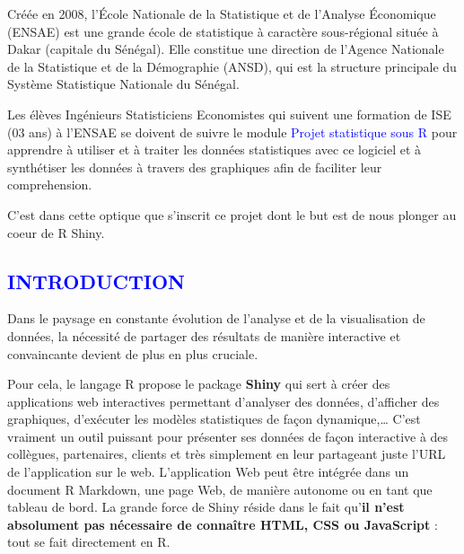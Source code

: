 \documentclass[
]{article}
\author{}
\date{\vspace{-2.5em}}
\begin{document}


\newpage


\renewcommand{\contentsname}{\textcolor{blue}{Sommaire}}

\textcolor{blue}{\tableofcontents}

\newpage

\begin{tcolorbox}[colback=white,colframe=blue, title=Avant-propos ]

Créée en 2008, l’École Nationale de la Statistique et de l’Analyse Économique (ENSAE) est une grande école de statistique à caractère sous-régional située à Dakar (capitale du Sénégal). Elle constitue une direction de l’Agence Nationale de la Statistique et de la Démographie (ANSD), qui est la structure principale du Système Statistique Nationale du Sénégal. 


  Les élèves Ingénieurs Statisticiens Economistes qui suivent une formation de ISE (03 ans) à l'ENSAE  se doivent de suivre le module \textcolor{blue}{Projet statistique sous R } pour apprendre à utiliser et à traiter les données statistiques avec ce logiciel et à synthétiser les données à travers des graphiques afin de faciliter leur comprehension. 
  
  
C’est dans cette optique que s’inscrit ce projet dont le but est de nous plonger au coeur de R Shiny. 
  
\end{tcolorbox}

\newpage

\textcolor{blue}{\section*{INTRODUCTION}}

Dans le paysage en constante évolution de l'analyse et de la
visualisation de données, la nécessité de partager des résultats de
manière interactive et convaincante devient de plus en plus cruciale.

Pour cela, le langage R propose le package \textbf{Shiny} qui sert à
créer des applications web interactives permettant d'analyser des
données, d'afficher des graphiques, d'exécuter les modèles statistiques
de façon dynamique,\ldots{} C'est vraiment un outil puissant pour
présenter ses données de façon interactive à des collègues, partenaires,
clients et très simplement en leur partageant juste l'URL de
l'application sur le web. L'application Web peut être intégrée dans un
document R Markdown, une page Web, de manière autonome ou en tant que
tableau de bord. La grande force de Shiny réside dans le fait
qu'\textbf{il n'est absolument pas nécessaire de connaître HTML, CSS ou
JavaScript} : tout se fait directement en R.
\end{document}
